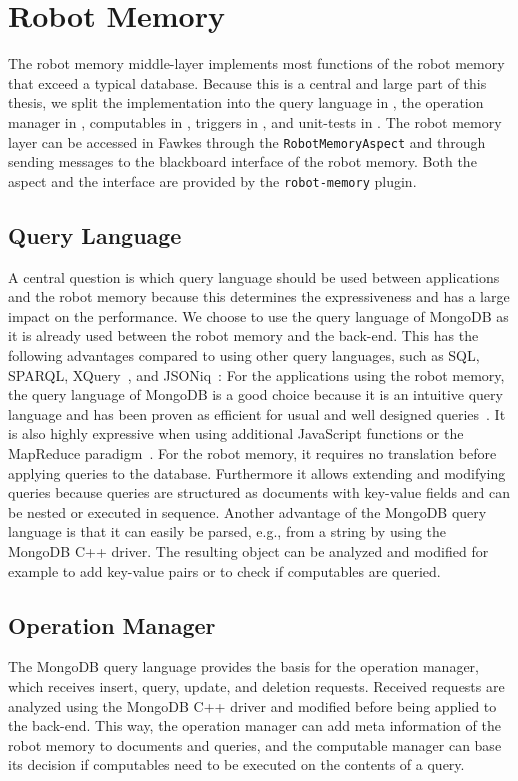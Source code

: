 \section{Robot Memory}
\label{sec:impl-memory}
The robot memory middle-layer implements most functions of the robot
memory that exceed a typical database. Because this is a central and
large part of this thesis, we split the implementation into the query
language in , the operation manager in
, computables in
, triggers in ,
and unit-tests in . The robot memory layer
can be accessed in Fawkes through the \texttt{RobotMemoryAspect} and
through sending messages to the blackboard interface of the robot
memory. Both the aspect and the interface are provided by the
\texttt{robot-memory} plugin.

\subsection{Query Language}
\label{sec:impl-query-language}
A central question is which query language should be used between
applications and the robot memory because this determines the
expressiveness and has a large impact on the performance. We choose to
use the query language of MongoDB as it is already used between the
robot memory and the back-end. This has the following advantages compared to
using other query languages, such as SQL, SPARQL,
XQuery~\cite{query-languages}, and JSONiq~\cite{jsoniq}:  For the
applications using the robot memory, the query language of MongoDB is
a good choice because it is an intuitive query language and has been
proven as efficient for usual and well designed queries~\cite{RoboDB}. It is also
highly expressive when using additional JavaScript functions or the
MapReduce paradigm~\cite{mongodb}.
For the robot memory, it
requires no translation before applying queries to the
database. Furthermore it allows extending and modifying queries
because queries are structured as documents with key-value fields and
can be nested or executed in sequence. Another advantage of the
MongoDB query language is that it can easily be parsed, e.g., from a
string by using the MongoDB C++ driver. The resulting object can be
analyzed and modified for example to add key-value pairs or to check
if computables are queried.

\subsection{Operation Manager}
\label{sec:impl-opmanager}
The MongoDB query language provides the basis for the operation
manager, which receives insert, query, update, and deletion
requests. Received requests are analyzed using the MongoDB C++ driver
and modified before being applied to the back-end. This way, the
operation manager can add meta information of the robot memory to
documents and queries, and the computable manager can base its
decision if computables need to be executed on the contents of a
query.

